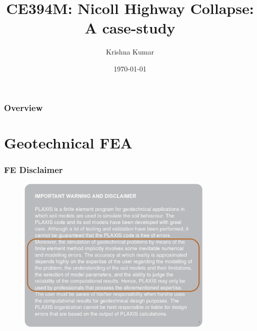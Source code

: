 \documentclass[handout]{beamer}
\title[CE394M: FEM Geo - case-study]{CE394M: Nicoll Highway Collapse: A case-study}
\author{Krishna Kumar} %
\institute[UT Austin] %
{
University of Texas at Austin \\
\medskip
\textit{
  \url{krishnak@utexas.edu}} %
}
\date{\today} %
\begin{document}
\begin{frame}
\titlepage %
\end{frame}

\begin{frame}
 \frametitle{Overview}
 \tableofcontents
\end{frame}

\section{Geotechnical FEA}
\begin{frame}
\frametitle{FE Disclaimer}
\begin{figure}[ht]
	\centering
	\includegraphics[width=0.85\textwidth]{figs/plaxis-disclaimer.png}
\end{figure}
\end{frame}
\end{document}
